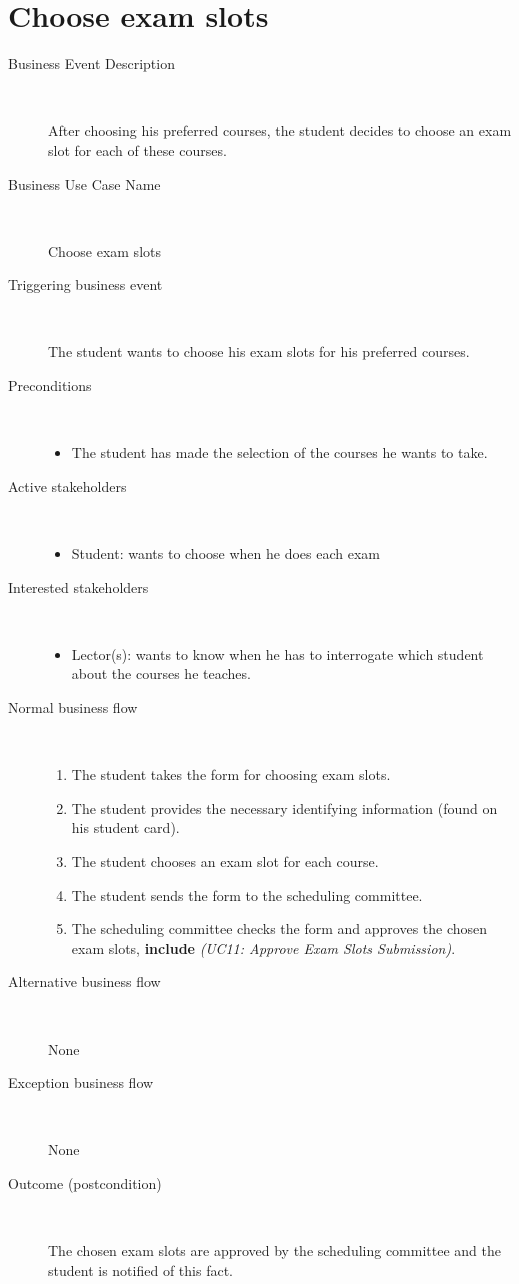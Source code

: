 \section{Choose exam slots}

\begin{description}
	\item[Business Event Description] \ 
		\par After choosing his preferred courses, the student decides to choose an
		exam slot for each of these courses.
	\item[Business Use Case Name] \ 
		\par Choose exam slots
	\item[Triggering business event] \ 
		\par The student wants to choose his exam slots for his preferred courses.
	\item[Preconditions] \
	\begin{itemize}
		\item The student has made the selection of the courses he wants to take.
	\end{itemize}
	\item[Active stakeholders] \ 
	\begin{itemize}
		\item Student: wants to choose when he does each exam
	\end{itemize}
	\item[Interested stakeholders] \ 
		\begin{itemize}
		\item Lector(s): wants to know when he has to interrogate which student about
		the courses he teaches.
		\end{itemize}
	\item[Normal business flow] \ 
	\begin{enumerate}
	  	\item The student takes the form for choosing exam slots.
	  	\item The student provides the necessary identifying information (found on
	  	his student card).
	  	\item The student chooses an exam slot for each course.
	  	\item The student sends the form to the scheduling committee.
	  	\item The scheduling committee checks the form and approves the chosen exam
	  	slots, \textbf{include} \emph{(UC11: Approve Exam Slots Submission)}.
	\end{enumerate}
	\item[Alternative business flow] \
		\par None 
	\item[Exception business flow] \ 
		\par None
	\item[Outcome (postcondition)] \ 
		\par The chosen exam slots are approved by the scheduling committee and the
		student is notified of this fact.
\end{description}